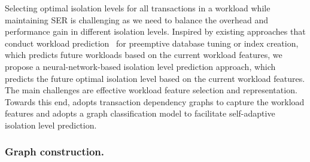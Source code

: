 Selecting optimal isolation levels for all transactions in a workload while maintaining SER is challenging as we need to balance the overhead and performance gain in different isolation levels.  
Inspired by existing approaches that conduct workload prediction~\cite{DBLP:conf/icde/ZhengZLYCPD24, DBLP:conf/sigmod/MaAHMPG18, DBLP:journals/pvldb/YuZSY24} for preemptive database tuning or index creation, which predicts future workloads based on the current workload features,  
we propose a neural-network-based isolation level prediction approach, which predicts the future optimal isolation level based on the current workload features. 
The main challenges are effective workload feature selection and representation. 
Towards this end, \sysname adopts transaction dependency graphs to capture the workload features and adopts a {\color{blue}graph classification model} to facilitate self-adaptive isolation level prediction.  


\subsubsection{Graph construction.} 

